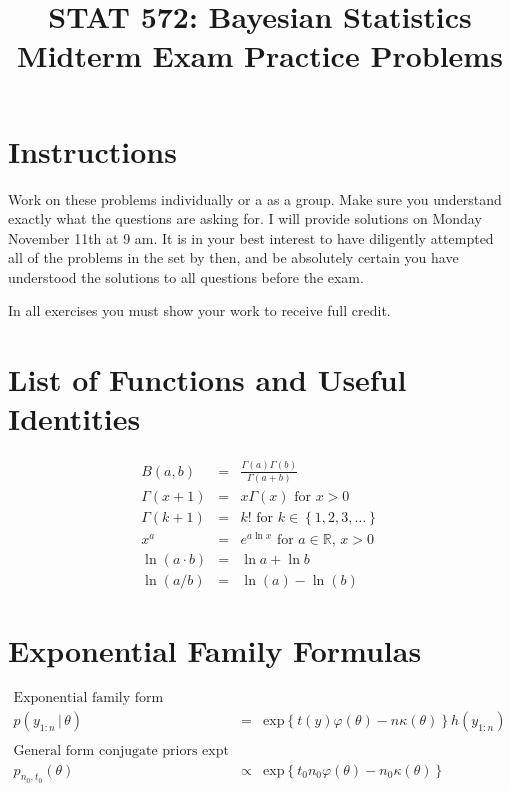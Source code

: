 \documentclass[12pt]{article}\usepackage[]{graphicx}\usepackage[]{color}
\newcommand{\1}{\mbs{1}}
\newcommand{\0}{\mbs{0}}
\newcommand{\lrp}[1]{\left(#1\right)}
\newcommand{\lrb}[1]{\left\{#1\right\}}
\newcommand{\bean}{\begin{eqnarray*}}
\newcommand{\eean}{\end{eqnarray*}}
\newcommand{\e}[1]{\text{exp}{\lrb{#1}}}
\newcommand{\given}{\,|\,}
\theoremstyle{definition}
\begin{document}
\setcounter{section}{0}
\title{%
STAT 572: Bayesian Statistics\\
Midterm Exam Practice Problems}

\author{}

\date{}							%

\maketitle

\thispagestyle{empty}

\section*{Instructions}

Work on these problems individually or a as a group.  Make sure you understand exactly what the questions are asking for. I will provide solutions on Monday November 11th at 9 am. It is in your best interest to have diligently attempted all of the problems in the set by then, and be absolutely certain you have understood the solutions to all questions before the exam.

\begin{center}
{\Large In all exercises you must show your work to receive full credit.}
\end{center}

\section*{List of Functions and Useful Identities}

\bean
B(a,b)&=&\frac{\Gamma(a)\Gamma(b)}{\Gamma(a+b)}\\
\Gamma(x+1)&=&x\Gamma(x)\text{ for }x>0\\
\Gamma(k+1)&=&k!\text{ for }k\in\lrb{1,2,3,\ldots}\\
x^a&=& e^{a\ln{x}}\text{ for }a\in\mathbb{R},\,x>0\\
\ln{\lrp{a\cdot b}}&=& \ln{a}+\ln{b}\\
\ln{\lrp{a/ b}}&=& \ln{\lrp{a}}-\ln{\lrp{b}}
\eean

\section*{Exponential Family Formulas}

\bean
\text{Exponential family form}&&\\
p(y_{1:n} \given \theta) &=& \e{t(y)\varphi(\theta) -n\kappa(\theta)}h(y_{1:n})\\
&&\\
\text{General form conjugate priors expt family}&&\\
p_{n_0,t_0}(\theta) &\propto& \e{t_0 n_0 \varphi(\theta) - n_0\kappa(\theta)}
\eean
\end{document}
